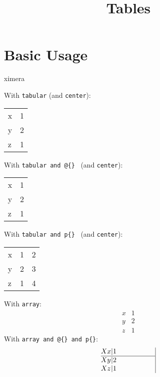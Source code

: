 \title{Tables}


\begin{abstract}
\end{abstract}
\maketitle

\section{Basic Usage}

ximera

        With \verb|tabular| (and \verb|center|):
        \begin{center}
            \begin{tabular}{lr}
                x & 1 \\
                y & 2 \\
                z & 1
            \end{tabular}
        \end{center}
        
        With \verb|tabular and @{} | (and \verb|center|):
        \begin{center}
            \begin{tabular}{@{}l@{ }r@{.}}
             x & 1 \\
             y & 2 \\
             z & 1
            \end{tabular}
            \end{center}

    With \verb|tabular and p{} | (and \verb|center|):
        \begin{center}
            \begin{tabular}{|p{1cm}|p{2cm}|p{3cm}|}
             x & 1 & 2\\
             y & 2 & 3\\
             z & 1 & 4
            \end{tabular}
        \end{center}

    With \verb|array|:
        $$
        \begin{array}{l|r}
         x & 1 \\
         \hline
         y & 2 \\
         z & 1
        \end{array}
        $$
    With \verb|array and @{} and p{}|:
        $$
        \begin{array}{@{X }l@{|}p{2cm}|}
         x & 1 \\
         \hline
         y & 2 \\
         z & 1
        \end{array}
        $$

